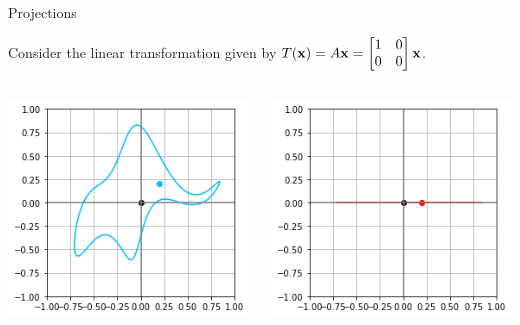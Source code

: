 \documentclass[xcolor=dvipsnames,aspectratio=169,t]{beamer}
\begin{document}
\begin{frame}{Projections}

Consider the linear transformation given by $\displaystyle T(\mathbf{x}) = A \mathbf{x} = \begin{bmatrix} 1 & 0 \\ 0 & 0 \end{bmatrix}\mathbf{x}$. 


\begin{columns}

\column{0.5\tw}

\begin{center}
\includegraphics[width=0.6\tw]{images/fig-elephant.png}
\end{center}

\column{0.5\tw}

\begin{center}
\includegraphics[width=0.6\tw]{images/fig-ele-project.png}
\end{center}

\end{columns}
\end{frame}
\end{document}

